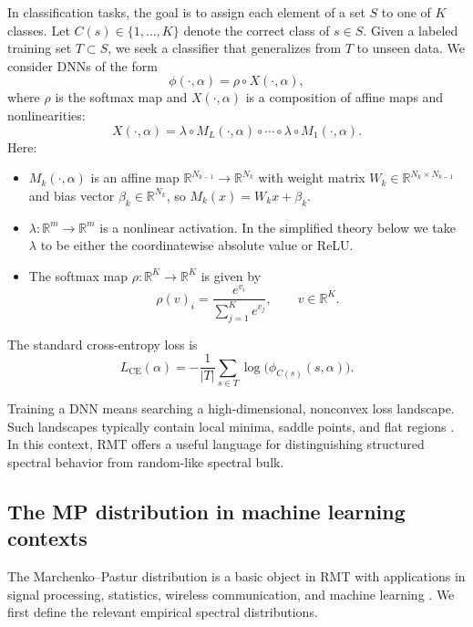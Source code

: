 \documentclass[11pt]{article}
\theoremstyle{plain}
\theoremstyle{definition}
\theoremstyle{remark}
\newcommand{\R}{\mathbb{R}}
\newcommand{\1}{\mathbf{1}}
\begin{document}
In classification tasks, the goal is to assign each element of a set \(S\) to one of \(K\) classes. Let \(C(s)\in\{1,\dots,K\}\) denote the correct class of \(s\in S\). Given a labeled training set \(T\subset S\), we seek a classifier that generalizes from \(T\) to unseen data. We consider DNNs of the form
\[
\phi(\cdot,\alpha)=\rho\circ X(\cdot,\alpha),
\]
where \(\rho\) is the softmax map and \(X(\cdot,\alpha)\) is a composition of affine maps and nonlinearities:
\[
X(\cdot,\alpha)=\lambda\circ M_L(\cdot,\alpha)\circ\cdots\circ\lambda\circ M_1(\cdot,\alpha).
\]
Here:
\begin{itemize}[leftmargin=2em]
\item \(M_k(\cdot,\alpha)\) is an affine map \(\R^{N_{k-1}}\to\R^{N_k}\) with weight matrix \(W_k\in\R^{N_k\times N_{k-1}}\) and bias vector \(\beta_k\in\R^{N_k}\), so \(M_k(x)=W_kx+\beta_k\).
\item \(\lambda:\R^m\to\R^m\) is a nonlinear activation. In the simplified theory below we take \(\lambda\) to be either the coordinatewise absolute value or ReLU.
\item The softmax map \(\rho:\R^K\to\R^K\) is given by
\begin{equation}
\label{soft_max_new}
\rho(v)_i=\frac{e^{v_i}}{\sum_{j=1}^{K} e^{v_j}},\qquad v\in\R^K.
\end{equation}
\end{itemize}
The standard cross-entropy loss is
\begin{equation}
\label{CE}
L_{\mathrm{CE}}(\alpha)=-\frac{1}{|T|}\sum_{s\in T}\log\big(\phi_{C(s)}(s,\alpha)\big).
\end{equation}

Training a DNN means searching a high-dimensional, nonconvex loss landscape. Such landscapes typically contain local minima, saddle points, and flat regions \cite{dauphin2014identifying,choromanska2015loss}. In this context, RMT offers a useful language for distinguishing structured spectral behavior from random-like spectral bulk.

\subsection{The MP distribution in machine learning contexts}
\label{sec:MP_distribution}

The Marchenko--Pastur distribution is a basic object in RMT with applications in signal processing, statistics, wireless communication, and machine learning \cite{vershynin2018high,ge2021large,serdobolskii2000multivariate,couillet2011random}. We first define the relevant empirical spectral distributions.
\end{document}
